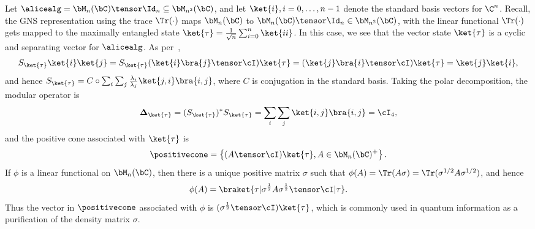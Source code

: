 \begin{example} \label{exam:StandardformFD}
	Let $\alicealg = \bM_n(\bC) \tensor \Id_n \subseteq \bM_{n^2}(\bC)$, and let $\ket{i}, i=0,\ldots,n-1$ denote the standard basis vectors for $\C^n$. Recall, the GNS representation using the trace $\Tr(\cdot)$ maps $\bM_n(\bC)$ to $\bM_n(\bC) \tensor \Id_n \in \bM_{n^2}(\bC)$, with the linear functional $\Tr(\cdot)$ gets mapped to the maximally entangled state $\ket{\tau} = \frac{1}{\sqrt{n}} \sum_{i=0}^n \ket{ii}$. In this case, we see that the vector state $\ket{\tau}$ is a cyclic and separating vector for $\alicealg$. As per~, 
	\begin{equation*}
		S_{\ket{\tau}} \ket{i}\ket{j}  = S_{\ket{\tau}} (\ket{i}\bra{j} \tensor \cI) \ket{\tau} =  (\ket{j}\bra{i} \tensor \cI) \ket{\tau}= \ket{j}\ket{i},
	\end{equation*}
	and hence $S_{\ket{\tau}} = C \circ \sum_i \sum_j \frac{\lambda_i}{\lambda_j} \ket{j,i}\bra{i,j}$, where $C$ is conjugation in the standard basis. Taking the polar decomposition, the modular operator is
	\begin{equation*}
		\mathbf{\Delta}_{\ket{\tau}} = (S_{\ket{\tau}})^* S_{\ket{\tau}} = \sum_i \sum_j  \ket{i,j}\bra{i,j} = \cI_4,
	\end{equation*}
	and the positive cone associated with $\ket{\tau}$ is
	\begin{equation*}
		\positivecone =\left\{  (A \tensor \cI) \ket{\tau},  A \in \bM_{n}(\bC)^{+} \right\}.
	\end{equation*}
	If $\phi$ is a linear functional on $\bM_n(\bC)$, then there is a unique positive matrix $\sigma$ such that $\phi(A) = \Tr(A\sigma) = \Tr(\sigma^{1/2} A \sigma^{1/2})$, and hence
	\begin{equation}
		\phi(A) = \braket{\tau|\sigma^{\frac{1}{2}}A\sigma^{\frac{1}{2}} \tensor \cI |\tau}.
	\end{equation}
	Thus the vector in $\positivecone$ associated with $\phi$ is $(\sigma^{\frac{1}{2}} \tensor \cI)\ket{\tau}$, which is commonly used in quantum information as a purification of the density matrix $\sigma$.
\end{example}


